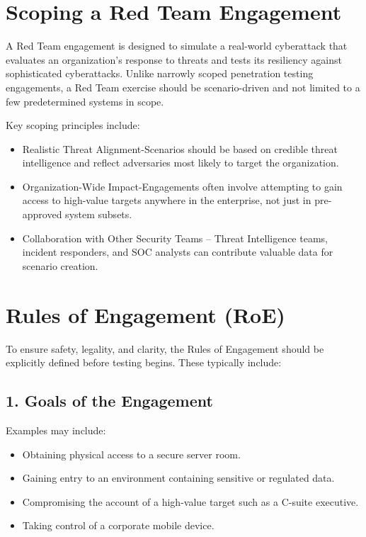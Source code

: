\section{Scoping a Red Team Engagement}
A Red Team engagement is designed to simulate a real-world cyberattack that evaluates an organization's response to threats and tests its resiliency against sophisticated cyberattacks. Unlike narrowly scoped penetration testing engagements, a Red Team exercise should be scenario-driven and not limited to a few predetermined systems in scope.

Key scoping principles include:
\begin{itemize}
    \item Realistic Threat Alignment-Scenarios should be based on credible threat intelligence and reflect adversaries most likely to target the organization.
    \item Organization-Wide Impact-Engagements often involve attempting to gain access to high-value targets anywhere in the enterprise, not just in pre-approved system subsets.
    \item Collaboration with Other Security Teams – Threat Intelligence teams, incident responders, and SOC analysts can contribute valuable data for scenario creation.
\end{itemize}

\section{Rules of Engagement (RoE)}
To ensure safety, legality, and clarity, the Rules of Engagement should be explicitly defined before testing begins. These typically include:

\subsection{1. Goals of the Engagement}

 Examples may include:
\begin{itemize}
    \item Obtaining physical access to a secure server room.
    \item Gaining entry to an environment containing sensitive or regulated data.
    \item Compromising the account of a high-value target such as a C-suite executive.
    \item Taking control of a corporate mobile device.
\end{itemize}

